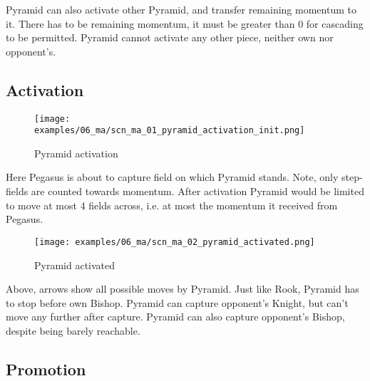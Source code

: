 Pyramid can also activate other Pyramid, and transfer remaining momentum to it.
There has to be remaining momentum, it must be greater than 0 for cascading
to be permitted. Pyramid cannot activate any other piece, neither own nor
opponent's.

\clearpage %

\subsection*{Activation}
\label{sec:Mayan Ascendancy/Pyramid/Activation}

\noindent
\begin{figure}[!h]
\texttt{[image: examples/06\_ma/scn\_ma\_01\_pyramid\_activation\_init.png]}
\caption{Pyramid activation}
\label{fig:scn_ma_01_pyramid_activation_init}
\end{figure}

Here Pegasus is about to capture field on which Pyramid stands. Note, only
step-fields are counted towards momentum. After activation Pyramid would be
limited to move at most 4 fields across, i.e. at most the momentum it received
from Pegasus.

\clearpage %

\noindent
\begin{figure}[!h]
\texttt{[image: examples/06\_ma/scn\_ma\_02\_pyramid\_activated.png]}
\caption{Pyramid activated}
\label{fig:scn_ma_02_pyramid_activated}
\end{figure}

Above, arrows show all possible moves by Pyramid. Just like Rook, Pyramid has to
stop before own Bishop. Pyramid can capture opponent's Knight, but can't move any
further after capture. Pyramid can also capture opponent's Bishop, despite being
barely reachable.

\clearpage %

\subsection*{Promotion}
\label{sec:Mayan Ascendancy/Pyramid/Promotion}

